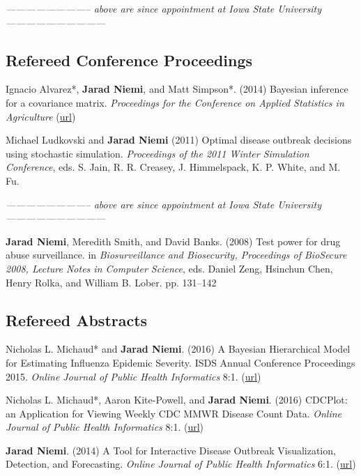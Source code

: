 \documentclass[overlapped,line]{res}
\newcommand{\sinceappt}{\emph{-------------------------- above are since appointment at Iowa State University ------------------------------}}
\newcommand{\sinceappt}{}
\begin{document}
\begin{resume}
\sinceappt

\subsection{\bf Refereed Conference Proceedings} \vspace{-0.2in}

Ignacio Alvarez*, {\bf Jarad Niemi}, and Matt Simpson*. (2014) Bayesian inference for a covariance matrix. \emph{Proceedings for the Conference on Applied Statistics in Agriculture} (\href{http://newprairiepress.org/agstatconference/2014/proceedings/8/}{url})

Michael Ludkovski and {\bf Jarad Niemi} (2011) Optimal disease outbreak decisions using stochastic simulation. \emph{Proceedings of the 2011 Winter Simulation Conference}, eds. S. Jain, R. R. Creasey, J. Himmelspack, K. P. White, and M. Fu.

\sinceappt

{\bf Jarad Niemi}, Meredith Smith, and David Banks. (2008) Test power for drug abuse surveillance. in \emph{Biosurveillance and Biosecurity, Proceedings of BioSecure 2008, Lecture Notes in Computer Science},  eds. Daniel Zeng, Hsinchun Chen, Henry Rolka, and William B. Lober. pp. 131--142



\subsection{\bf Refereed Abstracts} \vspace{-0.2in}

Nicholas L. Michaud* and {\bf Jarad Niemi}. (2016) A Bayesian Hierarchical Model for Estimating Influenza Epidemic Severity. ISDS Annual Conference Proceedings 2015. \emph{Online Journal of Public Health Informatics} 8:1. (\href{http://ojphi.org/ojs/index.php/ojphi/article/view/6438}{url})

Nicholas L. Michaud*, Aaron Kite-Powell, and {\bf Jarad Niemi}. (2016) CDCPlot: an Application for Viewing Weekly CDC MMWR Disease Count Data. \emph{Online Journal of Public Health Informatics} 8:1. (\href{http://ojphi.org/ojs/index.php/ojphi/article/view/6556}{url})

{\bf Jarad Niemi}. (2014) A Tool for Interactive Disease Outbreak Visualization, Detection, and Forecasting. \emph{Online Journal of Public Health Informatics} 6:1. (\href{http://ojphi.org/article/view/5017}{url})


\end{resume}
\end{document}
